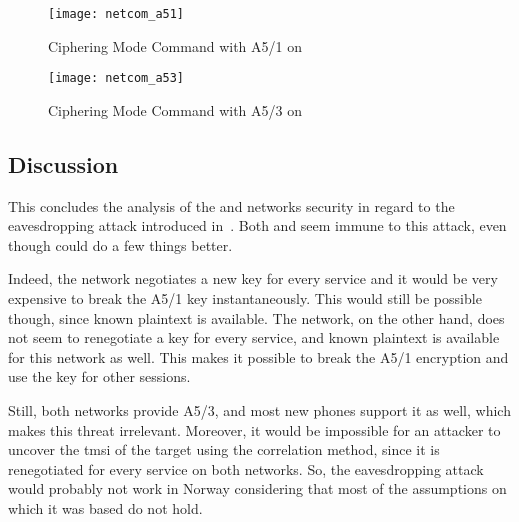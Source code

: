       \begin{figure}
        \centering
        \texttt{[image: netcom\_a51]}
        \caption{Ciphering Mode Command with A5/1 on }
        \label{fig:netcom_a51}
      \end{figure}

      \begin{figure}
        \centering
        \texttt{[image: netcom\_a53]}
        \caption{Ciphering Mode Command with A5/3 on }
        \label{fig:netcom_a53}
      \end{figure}

      \iffalse
      While \comp{Netcom} asks the \gls{ms} for its capabilities on
      every \gls{imsi} attach, it is not the case for \comp{Telenor}.
      Therefore, it might take a while for a phone suddenly advertising
      A5/3 support instead of A5/1 to benefit from the stronger
      encryption, since the network is not aware of the change.
      \fi

    \subsection{Discussion}

      This concludes the analysis of the  and
       networks security in regard to the eavesdropping
      attack introduced in~. Both
       and  seem immune to this attack, even
      though  could do a few things better.

      Indeed, the  network negotiates a new key for every
      service and it would be very expensive to break the A5/1 key
      instantaneously. This would still be possible though, since known
      plaintext is available. The  network, on the other
      hand, does not seem to renegotiate a key for every service, and
      known plaintext is available for this network as well. This makes
      it possible to break the A5/1 encryption and use the key for other
      sessions.

      Still, both networks provide A5/3, and most new phones support it
      as well, which makes this threat irrelevant. Moreover, it would be
      impossible for an attacker to uncover the \gls{tmsi} of the target
      using the correlation method, since it is renegotiated for every
      service on both networks. So, the eavesdropping attack would
      probably not work in Norway considering that most of the
      assumptions on which it was based do not hold.

